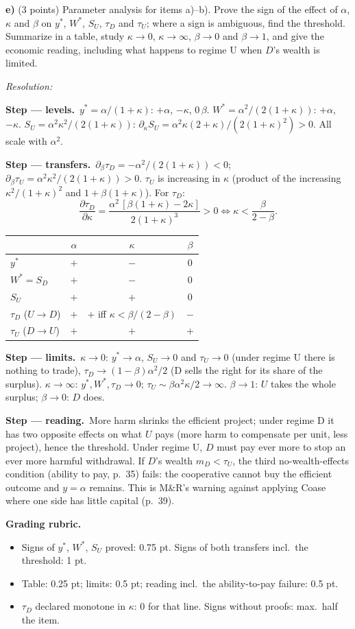 \documentclass[11pt,a4paper]{article}
\newif\ifsolucoes
\newcommand{\espacoresol}{5cm}   %
\newcommand{\resolespaco}{\ifsolucoes\else\par\textit{Resolution:}\vspace{\espacoresol}\par\fi}
\newcommand{\passo}[2]{\par\smallskip\noindent\textbf{Step --- #1.}~#2}
\newcommand{\rubrica}[1]{\par\smallskip\noindent\textbf{Grading rubric.}\begin{itemize}[leftmargin=1.4em,topsep=1pt]#1\end{itemize}}
\begin{document}
\textbf{e)} (3 points) Parameter analysis for items a)--b). Prove the sign of the effect of
$\alpha$, $\kappa$ and $\beta$ on $y^*$, $W^*$, $S_U$, $\tau_D$ and $\tau_U$; where a sign is
ambiguous, find the threshold. Summarize in a table, study $\kappa\to0$, $\kappa\to\infty$,
$\beta\to0$ and $\beta\to1$, and give the economic reading, including what happens to regime U
when $D$'s wealth is limited.
\resolespaco
\begin{sol}
\passo{levels}{$y^*=\alpha/(1+\kappa)$: $+\alpha$, $-\kappa$, $0\,\beta$.
$W^*=\alpha^2/(2(1+\kappa))$: $+\alpha$, $-\kappa$. $S_U=\alpha^2\kappa^2/(2(1+\kappa))$:
$\partial_\kappa S_U=\alpha^2\kappa(2+\kappa)/(2(1+\kappa)^2)>0$. All scale with $\alpha^2$.}
\passo{transfers}{$\partial_\beta\tau_D=-\alpha^2/(2(1+\kappa))<0$;
$\partial_\beta\tau_U=\alpha^2\kappa^2/(2(1+\kappa))>0$. $\tau_U$ is increasing in $\kappa$
(product of the increasing $\kappa^2/(1+\kappa)^2$ and $1+\beta(1+\kappa)$). For $\tau_D$:
$$\frac{\partial\tau_D}{\partial\kappa}=\frac{\alpha^2\,[\beta(1+\kappa)-2\kappa]}{2(1+\kappa)^3}>0
\iff\kappa<\frac{\beta}{2-\beta}.$$}
\begin{center}
\begin{tabular}{lccc}\toprule
 & $\alpha$ & $\kappa$ & $\beta$\\\midrule
$y^*$ & $+$ & $-$ & $0$\\
$W^*=S_D$ & $+$ & $-$ & $0$\\
$S_U$ & $+$ & $+$ & $0$\\
$\tau_D$ ($U\to D$) & $+$ & $+$ iff $\kappa<\beta/(2-\beta)$ & $-$\\
$\tau_U$ ($D\to U$) & $+$ & $+$ & $+$\\\bottomrule
\end{tabular}
\end{center}
\passo{limits}{$\kappa\to0$: $y^*\to\alpha$, $S_U\to0$ and $\tau_U\to0$ (under regime U there is
nothing to trade), $\tau_D\to(1-\beta)\alpha^2/2$ (D sells the right for its share of the
surplus). $\kappa\to\infty$: $y^*,W^*,\tau_D\to0$; $\tau_U\sim\beta\alpha^2\kappa/2\to\infty$.
$\beta\to1$: $U$ takes the whole surplus; $\beta\to0$: $D$ does.}
\passo{reading}{More harm shrinks the efficient project; under regime D it has two opposite
effects on what $U$ pays (more harm to compensate per unit, less project), hence the threshold.
Under regime U, $D$ must pay ever more to stop an ever more harmful withdrawal. If $D$'s wealth
$m_D<\tau_U$, the third no-wealth-effects condition (ability to pay, p.~35) fails: the
cooperative cannot buy the efficient outcome and $y=\alpha$ remains. This is M\&R's warning
against applying Coase where one side has little capital (p.~39).}
\rubrica{
\item Signs of $y^*$, $W^*$, $S_U$ proved: 0.75 pt. Signs of both transfers incl.\ the threshold: 1 pt.
\item Table: 0.25 pt; limits: 0.5 pt; reading incl.\ the ability-to-pay failure: 0.5 pt.
\item $\tau_D$ declared monotone in $\kappa$: 0 for that line. Signs without proofs: max.\ half the item.
}
\end{sol}
\end{document}
